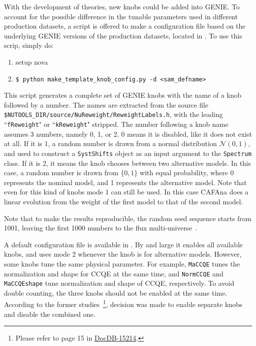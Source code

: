 \documentclass[12pt,a4paper,final]{iopart}
\begin{document}
With the development of theories, new knobs could be added into GENIE. To account for the possible difference in the tunable parameters used in different production datasets, a script is offered to make a configuration file based on the underlying GENIE versions of the production datasets, located in . To use this scrip, simply do:
\begin{enumerate}
  \item setup nova
  \item \texttt{\$ python make\_template\_knob\_config.py -d \textless sam\_defname\textgreater}
\end{enumerate}
This script generates a complete set of GENIE knobs with the name of a knob followed by a number. The names are extracted from the source file \texttt{\$NUTOOLS\_DIR/source/NuReweight/ReweightLabels.h}, with the leading ``\texttt{fReweight}" or ``\texttt{kReweight}" stripped. The number following a knob name assumes 3 numbers, namely 0, 1, or 2. 0 means it is disabled, like it does not exist at all. If it is 1, a random number is drawn from a normal distribution $\mathcal{N}(0,1)$, and used to construct a \texttt{SystShifts} object as an input argument to the \texttt{Spectrum} class. If it is 2, it means the knob chooses between two alternative models. In this case, a random number is drawn from $\{0,1\}$ with equal probability, where 0 represents the nominal model, and 1 represents the alternative model. Note that even for this kind of knobs mode 1 can still be used. In this case CAFAna does a linear evolution from the weight of the first model to that of the second model.

Note that to make the results reproducible, the random seed sequence starts from 1001, leaving the first 1000 numbers to the flux multi-universe~\cite{ref2}.

A default configuration file is available in . By and large it enables all available knobs, and uses mode 2 whenever the knob is for alternative models. However, some knobs tune the same physical parameter. For example, \texttt{MaCCQE} tunes the normalization and shape for CCQE at the same time, and \texttt{NormCCQE} and \texttt{MaCCQEshape} tune normalization and shape of CCQE, respectively. To avoid double counting, the three knobs should not be enabled at the same time. According to the former studies~\footnote{Please refer to page 15 in \href{https://nova-docdb.fnal.gov:441/cgi-bin/ShowDocument?docid=15214}{DocDB-15214}.}, decision was made to enable separate knobs and disable the combined one.
\end{document}
